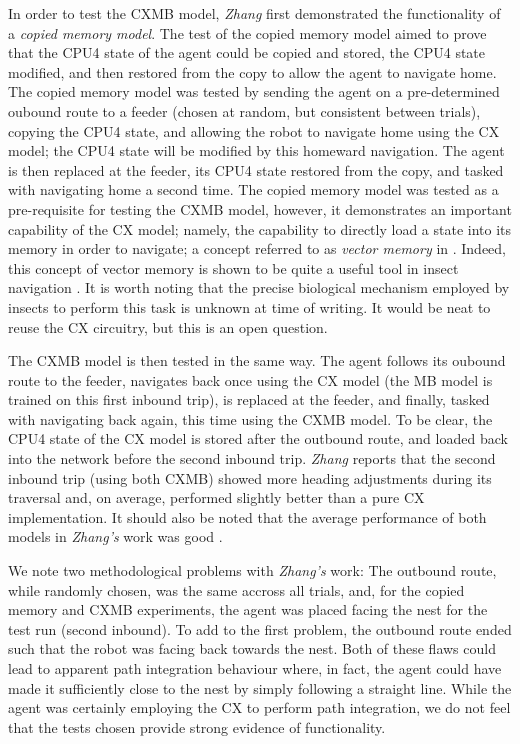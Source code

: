 \documentclass[a4paper,11pt,twoside,openright]{article}
\begin{document}
In order to test the CXMB model, \textit{Zhang} first demonstrated the
functionality of a \textit{copied memory model}. The test of the copied memory
model aimed to prove that the CPU4 state of the agent could be copied and stored,
the CPU4 state modified, and then restored from the copy to allow the agent to
navigate home. The copied memory model was tested by sending the agent on a
pre-determined oubound route to a feeder (chosen at random, but consistent
between trials), copying the CPU4 state, and allowing the robot to navigate home
using the CX model; the CPU4 state will be modified by this homeward navigation.
The agent is then replaced at the feeder, its CPU4 state restored from the copy,
and tasked with navigating home a second time. The copied memory model was tested
as a pre-requisite for testing the CXMB model, however, it demonstrates an
important capability of the CX model; namely, the capability to directly load a
state into its memory in order to navigate; a concept referred to as
\textit{vector memory} in \cite{Webb2019}. Indeed, this concept of vector memory
is shown to be quite a useful tool in insect navigation \cite{Webb2019}. It is
worth noting that the precise biological mechanism employed by insects to
perform this task is unknown at time of writing. It would be neat to reuse
the CX circuitry, but this is an open question.
\newline
\par

The CXMB model is then tested in the same way. The agent follows its oubound
route to the feeder, navigates back once using the CX model (the MB model is
trained on this first inbound trip), is replaced at the
feeder, and finally, tasked with navigating back again, this time using the CXMB
model. To be clear, the CPU4 state of the CX model is stored after the outbound
route, and loaded back into the network before the second inbound trip.
\textit{Zhang} reports that the second inbound trip (using both CXMB) showed
more heading adjustments during its traversal and, on average, performed
slightly better than a pure CX implementation\cite{Zhang2017}. It should also
be noted that the average performance of both models in \textit{Zhang's} work
was good \cite{Zhang2017}.
\newline
\par

We note two methodological problems with \textit{Zhang's} work: The outbound
route, while randomly chosen, was the same accross all trials, and, for the
copied memory and CXMB experiments, the agent was placed facing the nest for
the test run (second inbound). To add to the first problem, the outbound route
ended such that the robot was facing back towards the nest. Both of these flaws
could lead to apparent path integration behaviour where, in fact, the agent
could have made it sufficiently close to the nest by simply following a straight
line. While the agent was certainly employing the CX to perform path integration,
we do not feel that the tests chosen provide strong evidence of functionality.
\end{document}
